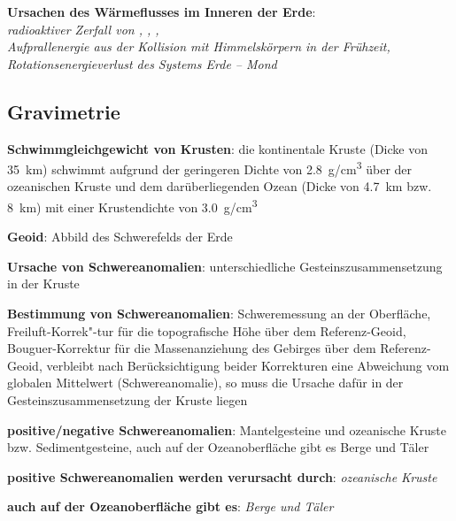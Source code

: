 \begin{wichtig}
    \item
    \textbf{Ursachen des Wärmeflusses im Inneren der Erde}:\\
    \emph{radioaktiver Zerfall von , , ,\\
    Aufprallenergie aus der Kollision mit Himmelskörpern in der Frühzeit,\\
    Rotationsenergieverlust des Systems Erde -- Mond}
\end{wichtig}

\subsection{%
    Gravimetrie%
}

\textbf{Schwimmgleichgewicht von Krusten}:
die kontinentale Kruste (Dicke von \SI{35}{\kilo\meter}) schwimmt aufgrund der geringeren
Dichte von \SI{2.8}{\gram/\centi\meter\cubed} über der ozeanischen Kruste und dem
darüberliegenden Ozean (Dicke von \SI{4.7}{\kilo\meter} bzw. \SI{8}{\kilo\meter})
mit einer Krustendichte von \SI{3.0}{\gram/\centi\meter\cubed}

\textbf{Geoid}:
Abbild des Schwerefelds der Erde

\textbf{Ursache von Schwereanomalien}:
unterschiedliche Gesteinszusammensetzung in der Kruste

\textbf{Bestimmung von Schwereanomalien}:
Schweremessung an der Oberfläche,
Freiluft-Korrek"-tur für die topografische Höhe über dem Referenz-Geoid,
Bouguer-Korrektur für die Massenanziehung des Gebirges über dem Referenz-Geoid,
verbleibt nach Berücksichtigung beider Korrekturen eine Abweichung vom globalen Mittelwert
(Schwereanomalie), so muss die Ursache dafür in der Gesteinszusammensetzung der Kruste liegen

\textbf{positive/negative Schwereanomalien}:
Mantelgesteine und ozeanische Kruste bzw. Sedimentgesteine,
auch auf der Ozeanoberfläche gibt es Berge und Täler

\begin{wichtig}
    \item
    \textbf{positive Schwereanomalien werden verursacht durch}:
    \emph{ozeanische Kruste}

    \item
    \textbf{auch auf der Ozeanoberfläche gibt es}:
    \emph{Berge und Täler}
\end{wichtig}

\pagebreak

